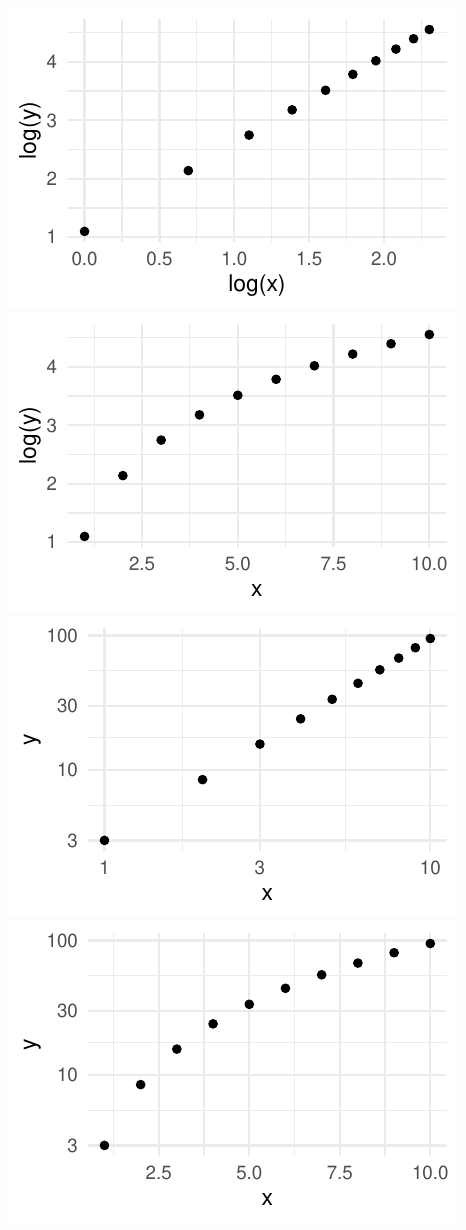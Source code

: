 \documentclass[twoside]{book}\usepackage[]{graphicx}\usepackage[]{xcolor}
\makeatletter
\def\maxwidth{ %
  \ifdim\Gin@nat@width>\linewidth
    \linewidth
  \else
    \Gin@nat@width
  \fi
}
\newenvironment{knitrout}{}{} %
\makeatother
\begin{document}
\begin{knitrout}
{\centering \includegraphics[width=\maxwidth]{figures/fig-unnamed-chunk-249-1} 
\includegraphics[width=\maxwidth]{figures/fig-unnamed-chunk-249-2} 
\includegraphics[width=\maxwidth]{figures/fig-unnamed-chunk-249-3} 
\includegraphics[width=\maxwidth]{figures/fig-unnamed-chunk-249-4} 

}
\end{knitrout}
\end{document}
